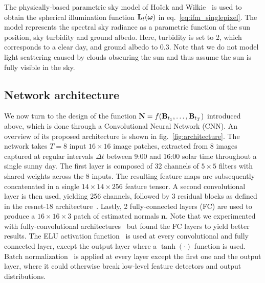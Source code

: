 
The physically-based parametric sky model of Ho\v{s}ek and Wilkie~\cite{hosek-tog-12} is used to obtain the spherical illumination function ${\bf L}_t(\mathbf{\boldsymbol \omega})$ in eq.~\eqref{eq:ifm_singlepixel}. The model represents the spectral sky radiance as a parametric function of the sun position, sky turbidity and ground albedo. Here, turbidity is set to 2, which corresponds to a clear day, and ground albedo to 0.3. Note that we do not model light scattering caused by clouds obscuring the sun and thus assume the sun is fully visible in the sky.

\subsection{Network architecture}
\label{sec:architecture}

We now turn to the design of the function ${\bf N} = f({\bf B}_{t_1}, \ldots, {\bf B}_{t_T})$ introduced above, which is done through a Convolutional Neural Network (CNN). An overview of its proposed architecture is shown in fig.~\ref{fig:architecture}. The network takes $T=8$ input $16 \times 16$ image patches, extracted from 8 images captured at regular intervals $\Delta t$ between 9:00 and 16:00 solar time throughout a single sunny day. The first layer is composed of 32 channels of $5 \times 5$ filters with shared weights across the 8 inputs. The resulting feature maps are subsequently concatenated in a single $14 \times 14 \times 256$ feature tensor. A second convolutional layer is then used, yielding 256 channels, followed by 3 residual blocks as defined in the resnet-18 architecture~\cite{he-cvpr-16}. Lastly, 2 fully-connected layers (FC) are used to produce a $16 \times 16 \times 3$ patch of estimated normals $\mathbf{n}$. Note that we experimented with fully-convolutional architectures~\cite{taniai-arxiv-18} but found the FC layers to yield better results. The ELU activation function~\cite{clevert-iclr-16} is used at every convolutional and fully connected layer, except the output layer where a $\tanh(\cdot)$ function is used. Batch normalization~\cite{ioffe-icml-15} is applied at every layer except the first one and the output layer, where it could otherwise break low-level feature detectors and output distributions.


